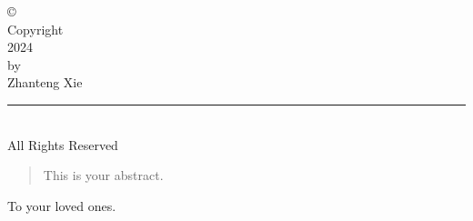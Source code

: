 %
%
%

\begin{copyrightpage}
    \begin{center}
      \copyright \\
      Copyright \\
      2024\\
       \vspace{0.5cm}
       by\\
       \vspace{0.5cm}
       Zhanteng Xie \\
       \vspace{-8pt}
       \noindent\rule{3.5cm}{0.4pt}\\
       All Rights Reserved
   \end{center}
\end{copyrightpage}

\begin{abstract}
This is your abstract. 
\end{abstract}

\begin{dedication}
To your loved ones.
\end{dedication}

